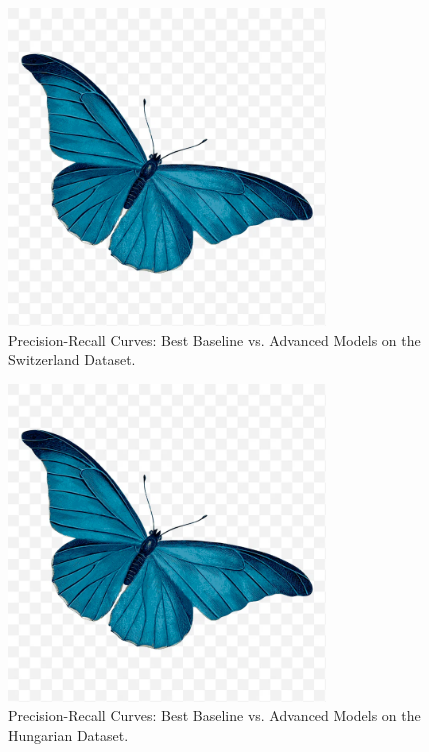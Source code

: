\documentclass{article}
\begin{document}
\begin{figure}[htbp]
    \centering
    \includegraphics[width=0.75\textwidth]{f1-type-dataset-catplot.png} %
    \caption{Precision-Recall Curves: Best Baseline vs. Advanced Models on the Switzerland Dataset.}
    \label{fig:pr_curve_switzerland}
\end{figure}

\begin{figure}[htbp]
    \centering
    \includegraphics[width=0.75\textwidth]{f1-type-dataset-catplot.png} %
    \caption{Precision-Recall Curves: Best Baseline vs. Advanced Models on the Hungarian Dataset.}
    \label{fig:pr_curve_hungarian}
\end{figure}
\end{document}
